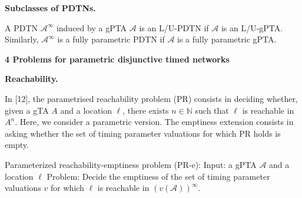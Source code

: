 \documentclass[10pt,a4paper]{article}
\begin{document}
 
 
 
\par\medskip\noindent\textbf{Subclasses of PDTNs.}\par
 
 
A PDTN ${\mathcal{A}}^{\infty}$ induced by a gPTA $\mathcal{A}$ is an L/U-PDTN if $\mathcal{A}$ is an L/U-gPTA. Similarly, ${\mathcal{A}}^{\infty}$ is a fully parametric PDTN if $\mathcal{A}$ is a fully parametric gPTA.\par
 
 
 


 
\par\medskip\noindent\textbf{4 Problems for parametric disjunctive timed networks}\par
 
 
\par\medskip\noindent\textbf{Reachability.}\par
 
 
In [12], the parametrised reachability problem (PR) consists in deciding whether, given a gTA ${A}$ and a location $\mathrm{\ell}$, there exists $n\in\mathbb{N}$ such that $\mathrm{\ell}$ is reachable in ${{A}}^{n}$. Here, we consider a parametric version. The emptiness extension consists in asking whether the set of timing parameter valuations for which PR holds is empty.\par
 
 
 
Parameterized reachability-emptiness problem (PR-e): Input: a gPTA $\mathcal{A}$ and a location $\mathrm{\ell}$ Problem: Decide the emptiness of the set of timing parameter valuations $v$ for which $\mathrm{\ell}$ is reachable in ${(v(\mathcal{A}))}^{\infty}$.\par
 
 
 
\end{document}
